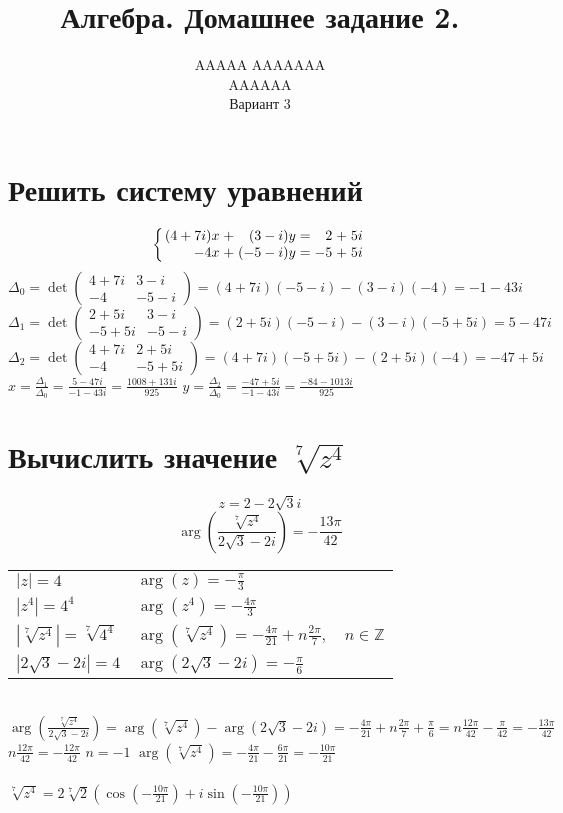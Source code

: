 \documentclass{article}
\title{Алгебра. Домашнее задание 2.}
\author{AAAAA AAAAAAA \\ AAAAAA \\ Вариант 3}
\newcommand{\ds}{\displaystyle}
\newcommand{\abs}[1]{\left|#1\right|}
\newcommand{\Arg}[1]{\arg\left(#1\right)}
\newcommand{\TrigFrom}[1]{
  \left(\cos\left({#1}\right)+i\sin\left({#1}\right)\right)
}
\begin{document}
  \maketitle

  \section{Решить систему уравнений}
  \[
    \left\{
      \arraycolsep=1.4pt
      \begin{array}{rrrrrrr}
        (4+7i)x &+& (3-i)y &=& 2&+&5i \\
        -4x &+& (-5-i)y &=& -5&+&5i
      \end{array}
    \right.
  \]
  $\ds \Delta_0 = \det\begin{pmatrix}
    4+7i & 3-i \\
    -4 & -5-i
  \end{pmatrix} = (4+7i)(-5-i)-(3-i)(-4) = -1-43i$
  \\
  $\ds \Delta_1 = \det\begin{pmatrix}
    2+5i & 3-i \\
    -5+5i & -5-i
  \end{pmatrix} = (2+5i)(-5-i)-(3-i)(-5+5i) = 5-47i$
  \\
  $\ds \Delta_2 = \det\begin{pmatrix}
    4+7i & 2+5i \\
    -4 & -5+5i
  \end{pmatrix} = (4+7i)(-5+5i)-(2+5i)(-4) = -47+5i$
  \\
  $\ds x = \frac{\Delta_1}{\Delta_0} = \frac{5-47i}{-1-43i} = \frac{1008 + 131i}{925}$ \quad
  $\ds y = \frac{\Delta_2}{\Delta_0} = \frac{-47+5i}{-1-43i} = \frac{-84 - 1013i}{925}$

  \section{Вычислить значение $\sqrt[7]{z^4}$}
  $$ z = 2 - 2\sqrt{3}i $$
  $$ \Arg{ \frac{\sqrt[7]{z^4}}{2\sqrt{3} - 2i} } = -\frac{13\pi}{42} $$
  \begin{tabular}{ll}
    $\ds \abs{z} = 4$ & $\ds \Arg z = -\frac{\pi}{3}$ \\
    $\ds \abs{z^4} = 4^4$ & $\ds \Arg{z^4} = -\frac{4\pi}{3}$ \\
    $\ds \abs{\sqrt[7]{z^4}} = \sqrt[7]{4^4}$ & $\ds \Arg{\sqrt[7]{z^4}} = -\frac{4\pi}{21} + n\frac{2\pi}{7},\quad n\in\mathbb{Z}$ \\
    $\ds \abs{2\sqrt{3} - 2i} = 4$ & $\ds \Arg{2\sqrt{3} - 2i} = -\frac{\pi}{6}$
  \end{tabular} \\
  $\ds \Arg{ \frac{\sqrt[7]{z^4}}{2\sqrt{3} - 2i} }
    = \Arg{\sqrt[7]{z^4}} - \Arg{2\sqrt{3} - 2i}
    = -\frac{4\pi}{21} + n\frac{2\pi}{7} + \frac{\pi}{6}
    = n\frac{12\pi}{42} - \frac{\pi}{42}
    = -\frac{13\pi}{42}
  $ \\
  $\ds n\frac{12\pi}{42} = -\frac{12\pi}{42}$ \quad $n = -1$ \quad
  $\ds \Arg{\sqrt[7]{z^4}} = -\frac{4\pi}{21} - \frac{6\pi}{21} = -\frac{10\pi}{21}$ \\ \\
  $\ds \sqrt[7]{z^4} = 2\sqrt[7]{2} \TrigFrom{-\frac{10\pi}{21}}$
\end{document}
